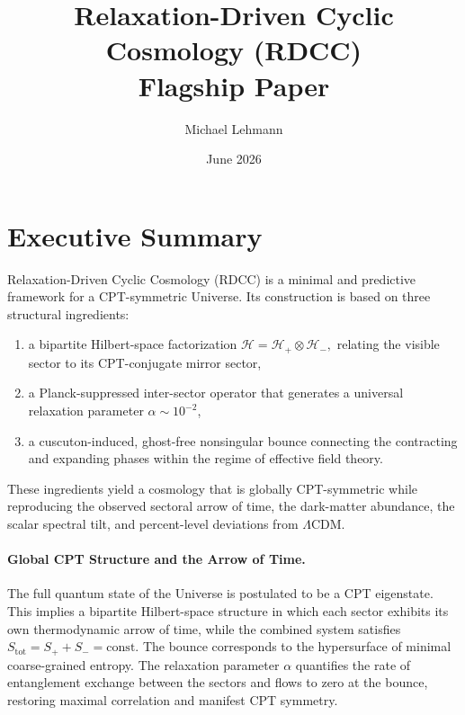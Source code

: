 \documentclass[11pt,a4paper]{article}
\title{\textbf{Relaxation-Driven Cyclic Cosmology (RDCC)}\\
\large Flagship Paper}
\author[1]{Michael Lehmann}
\affil[1]{\small Independent Researcher\\
\texttt{mi.lehmann@gmx.de}}
\date{June 2026}
\begin{document}
\maketitle
\thispagestyle{empty}

\section*{Executive Summary}

Relaxation-Driven Cyclic Cosmology (RDCC) is a minimal and predictive framework
for a CPT-symmetric Universe. Its construction is based on three structural
ingredients:

\begin{enumerate}[label=\textbf{(\alph*)}]
    \item a bipartite Hilbert-space factorization
    \(
        \mathcal{H} = \mathcal{H}_{+} \otimes \mathcal{H}_{-},
    \)
    relating the visible sector to its CPT-conjugate mirror sector,

    \item a Planck-suppressed inter-sector operator that generates a universal
    relaxation parameter \( \alpha \sim 10^{-2} \),

    \item a cuscuton-induced, ghost-free nonsingular bounce connecting the
    contracting and expanding phases within the regime of effective field theory.
\end{enumerate}

These ingredients yield a cosmology that is globally CPT-symmetric while
reproducing the observed sectoral arrow of time, the dark-matter abundance,
the scalar spectral tilt, and percent-level deviations from \(\Lambda\)CDM.

\paragraph{Global CPT Structure and the Arrow of Time.}
The full quantum state of the Universe is postulated to be a CPT eigenstate.
This implies a bipartite Hilbert-space structure in which each sector exhibits
its own thermodynamic arrow of time, while the combined system satisfies
\(
S_{\mathrm{tot}} = S_{+} + S_{-} = \mathrm{const}.
\)
The bounce corresponds to the hypersurface of minimal coarse-grained entropy.
The relaxation parameter \( \alpha \) quantifies the rate of entanglement
exchange between the sectors and flows to zero at the bounce, restoring maximal
correlation and manifest CPT symmetry.
\end{document}
